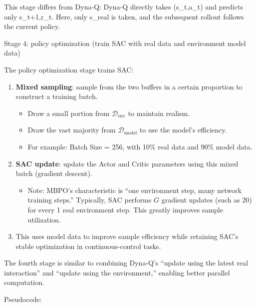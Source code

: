 This stage differs from Dyna-Q: Dyna-Q directly takes (s\_t,a\_t) and predicts only s\_t+1,r\_t. Here, only s\_real is taken, and the subsequent rollout follows the current policy.

Stage 4: policy optimization (train SAC with real data and environment model data)

The policy optimization stage trains SAC:

\begin{enumerate}
\def\labelenumi{\arabic{enumi}.}
\tightlist
\item
  \textbf{Mixed sampling}: sample from the two buffers in a certain proportion to construct a training batch.

  \begin{itemize}
  \tightlist
  \item
    Draw a small portion from \(\mathcal D_{\mathrm{env}}\) to maintain realism.
  \item
    Draw the vast majority from \(\mathcal D_{\mathrm{model}}\) to use the model's efficiency.
  \item
    For example: Batch Size = 256, with 10\% real data and 90\% model data.
  \end{itemize}
\item
  \textbf{SAC update}: update the Actor and Critic parameters using this mixed batch (gradient descent).

  \begin{itemize}
  \tightlist
  \item
    Note: MBPO's characteristic is ``one environment step, many network training steps.'' Typically, SAC performs \(G\) gradient updates (such as 20) for every 1 real environment step. This greatly improves sample utilization.
  \end{itemize}
\item
  This uses model data to improve sample efficiency while retaining SAC's stable optimization in continuous-control tasks.
\end{enumerate}

The fourth stage is similar to combining Dyna-Q's ``update using the latest real interaction'' and ``update using the environment,'' enabling better parallel computation.

Pseudocode:

